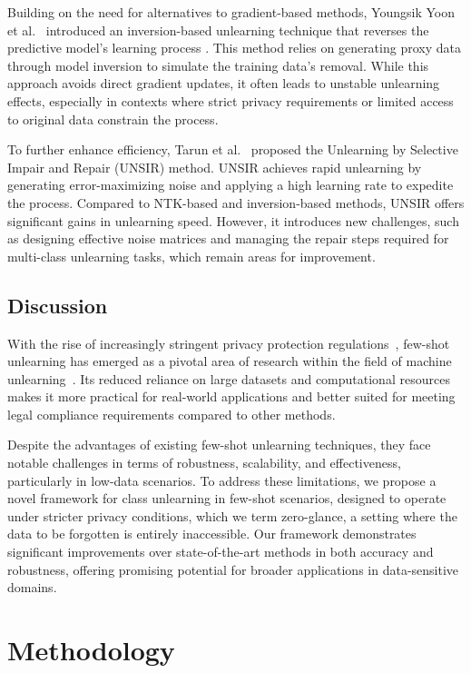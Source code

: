 \documentclass[preprint,12pt]{elsarticle}
\begin{document}
Building on the need for alternatives to gradient-based methods, Youngsik Yoon et al.~\cite{yoon2023fewshot}  introduced an inversion-based unlearning technique that reverses the predictive model's learning process \cite{parish2016paradigm}. This method relies on generating proxy data through model inversion to simulate the training data's removal. While this approach avoids direct gradient updates, it often leads to unstable unlearning effects, especially in contexts where strict privacy requirements or limited access to original data constrain the process.

To further enhance efficiency, Tarun et al.~\cite{tarun2023fast} proposed the Unlearning by Selective Impair and Repair (UNSIR) method. UNSIR achieves rapid unlearning by generating error-maximizing noise and applying a high learning rate to expedite the process. Compared to NTK-based and inversion-based methods, UNSIR offers significant gains in unlearning speed. However, it introduces new challenges, such as designing effective noise matrices and managing the repair steps required for multi-class unlearning tasks, which remain areas for improvement.

\subsection{Discussion}
With the rise of increasingly stringent privacy protection regulations~\cite{ausloos2012right}, few-shot unlearning has emerged as a pivotal area of research within the field of machine unlearning~\cite{liu2024survey}. Its reduced reliance on large datasets and computational resources makes it more practical for real-world applications and better suited for meeting legal compliance requirements compared to other methods.

Despite the advantages of existing few-shot unlearning techniques, they face notable challenges in terms of robustness, scalability, and effectiveness, particularly in low-data scenarios. To address these limitations, we propose a novel framework for class unlearning in few-shot scenarios, designed to operate under stricter privacy conditions, which we term zero-glance, a setting where the data to be forgotten is entirely inaccessible. Our framework demonstrates significant improvements over state-of-the-art methods in both accuracy and robustness, offering promising potential for broader applications in data-sensitive domains.

\section{Methodology}
\end{document}
